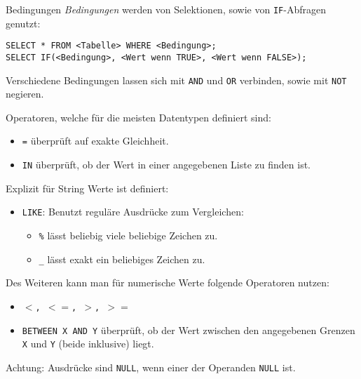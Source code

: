 \begin{sql}{Bedingungen}
    \emph{Bedingungen} werden von Selektionen, sowie von \texttt{IF}-Abfragen genutzt:

    \begin{verbatim}
SELECT * FROM <Tabelle> WHERE <Bedingung>;
SELECT IF(<Bedingung>, <Wert wenn TRUE>, <Wert wenn FALSE>);
    \end{verbatim}

    Verschiedene Bedingungen lassen sich mit \texttt{AND} und \texttt{OR} verbinden, sowie mit \texttt{NOT} negieren.

    Operatoren, welche für die meisten Datentypen definiert sind:

    \begin{itemize}
        \item \texttt{=} überprüft auf exakte Gleichheit.
        \item \texttt{IN} überprüft, ob der Wert in einer angegebenen Liste zu finden ist.
    \end{itemize}

    Explizit für String Werte ist definiert:

    \begin{itemize}
        \item \texttt{LIKE}: Benutzt reguläre Ausdrücke zum Vergleichen:
            \begin{itemize}
                \item \texttt{\%} lässt beliebig viele beliebige Zeichen zu.
                \item \texttt{\_} lässt exakt ein beliebiges Zeichen zu.
            \end{itemize}
    \end{itemize}

    Des Weiteren kann man für numerische Werte folgende Operatoren nutzen:

    \begin{itemize}
        \item \texttt{$<$, $<=$, $>$, $>=$}
        \item \texttt{BETWEEN X AND Y} überprüft, ob der Wert zwischen den angegebenen Grenzen \texttt{X} und \texttt{Y} (beide inklusive) liegt.
    \end{itemize}

    Achtung: Ausdrücke sind \texttt{NULL}, wenn einer der Operanden \texttt{NULL} ist.
\end{sql}

